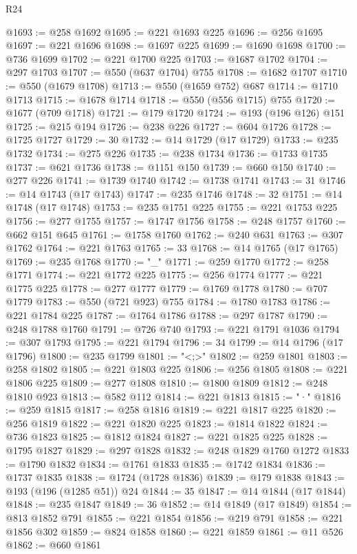 \begin{lexlean}{R24}
\begin{coremodule}
@1693 := @258 @1692
@1695 := @221 @1693 @225
@1696 := @256 @1695
@1697 := @221 @1696
@1698 := @1697 @225
@1699 := @1690 @1698
@1700 := @736 @1699
@1702 := @221 @1700 @225
@1703 := @1687 @1702
@1704 := @297 @1703
@1707 := @550 (@637 @1704) @755
@1708 := @1682 @1707
@1710 := @550 (@1679 @1708)
@1713 := @550 (@1659 @752) @687
@1714 := @1710 @1713
@1715 := @1678 @1714
@1718 := @550 (@556 @1715) @755
@1720 := @1677 (@709 @1718)
@1721 := @179 @1720
@1724 := @193 (@196 @126) @151
@1725 := @215 @194
@1726 := @238 @226
@1727 := @604 @1726
@1728 := @1725 @1727
@1729 := 30
@1732 := @14 @1729 (@17 @1729)
@1733 := @235 @1732
@1734 := @275 @226
@1735 := @238 @1734
@1736 := @1733 @1735
@1737 := @621 @1736
@1738 := @1151 @150
@1739 := @660 @150
@1740 := @277 @226
@1741 := @1739 @1740
@1742 := @1738 @1741
@1743 := 31
@1746 := @14 @1743 (@17 @1743)
@1747 := @235 @1746
@1748 := 32
@1751 := @14 @1748 (@17 @1748)
@1753 := @235 @1751 @225
@1755 := @221 @1753 @225
@1756 := @277 @1755
@1757 := @1747 @1756
@1758 := @248 @1757
@1760 := @662 @151 @645
@1761 := @1758 @1760
@1762 := @240 @631
@1763 := @307 @1762
@1764 := @221 @1763
@1765 := 33
@1768 := @14 @1765 (@17 @1765)
@1769 := @235 @1768
@1770 := "_"
@1771 := @259 @1770
@1772 := @258 @1771
@1774 := @221 @1772 @225
@1775 := @256 @1774
@1777 := @221 @1775 @225
@1778 := @277 @1777
@1779 := @1769 @1778
@1780 := @707 @1779
@1783 := @550 (@721 @923) @755
@1784 := @1780 @1783
@1786 := @221 @1784 @225
@1787 := @1764 @1786
@1788 := @297 @1787
@1790 := @248 @1788 @1760
@1791 := @726 @740
@1793 := @221 @1791 @1036
@1794 := @307 @1793
@1795 := @221 @1794
@1796 := 34
@1799 := @14 @1796 (@17 @1796)
@1800 := @235 @1799
@1801 := "<;>"
@1802 := @259 @1801
@1803 := @258 @1802
@1805 := @221 @1803 @225
@1806 := @256 @1805
@1808 := @221 @1806 @225
@1809 := @277 @1808
@1810 := @1800 @1809
@1812 := @248 @1810 @923
@1813 := @582 @112
@1814 := @221 @1813
@1815 := "·"
@1816 := @259 @1815
@1817 := @258 @1816
@1819 := @221 @1817 @225
@1820 := @256 @1819
@1822 := @221 @1820 @225
@1823 := @1814 @1822
@1824 := @736 @1823
@1825 := @1812 @1824
@1827 := @221 @1825 @225
@1828 := @1795 @1827
@1829 := @297 @1828
@1832 := @248 @1829 @1760 @1272
@1833 := @1790 @1832
@1834 := @1761 @1833
@1835 := @1742 @1834
@1836 := @1737 @1835
@1838 := @1724 (@1728 @1836)
@1839 := @179 @1838
@1843 := @193 (@196 (@1285 @51)) @24
@1844 := 35
@1847 := @14 @1844 (@17 @1844)
@1848 := @235 @1847
@1849 := 36
@1852 := @14 @1849 (@17 @1849)
@1854 := @813 @1852 @791
@1855 := @221 @1854
@1856 := @219 @791
@1858 := @221 @1856 @302
@1859 := @824 @1858
@1860 := @221 @1859
@1861 := @11 @526
@1862 := @660 @1861

\end{coremodule}
\end{lexlean}
